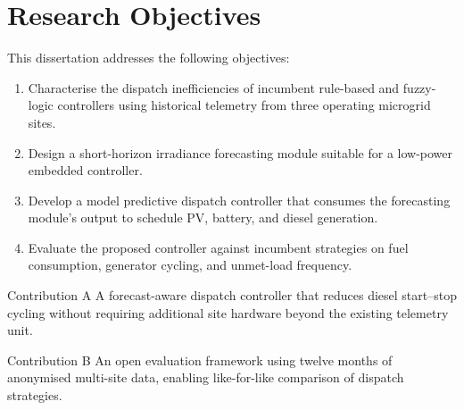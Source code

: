 \section{Research Objectives}
This dissertation addresses the following objectives:

\begin{enumerate}[label=O\arabic*.,leftmargin=2.2cm]
  \item Characterise the dispatch inefficiencies of incumbent rule-based and fuzzy-logic
        controllers using historical telemetry from three operating microgrid sites.
  \item Design a short-horizon irradiance forecasting module suitable for a low-power embedded
        controller.
  \item Develop a model predictive dispatch controller that consumes the forecasting module's
        output to schedule PV, battery, and diesel generation.
  \item Evaluate the proposed controller against incumbent strategies on fuel consumption,
        generator cycling, and unmet-load frequency.
\end{enumerate}

\noindent
\begin{minipage}{0.48\textwidth}
\begin{contribbox}{Contribution A}
A forecast-aware dispatch controller that reduces diesel start--stop cycling without
requiring additional site hardware beyond the existing telemetry unit.
\end{contribbox}
\end{minipage}
\hfill
\begin{minipage}{0.48\textwidth}
\begin{contribbox}{Contribution B}
An open evaluation framework using twelve months of anonymised multi-site data, enabling
like-for-like comparison of dispatch strategies.
\end{contribbox}
\end{minipage}
\par
